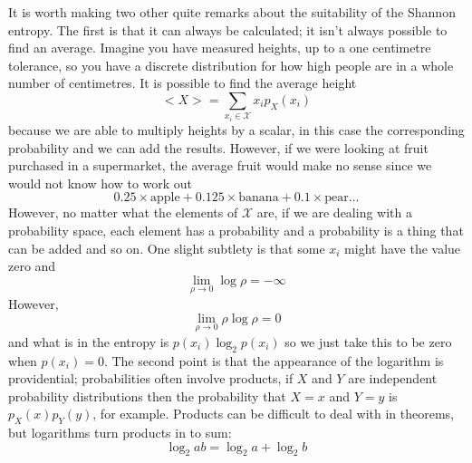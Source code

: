 \documentclass[11pt,a4paper]{scrartcl}
\begin{document}
It is worth making two other quite remarks about the suitability of
the Shannon entropy. The first is that it can always be calculated; it
isn't always possible to find an average. Imagine you have measured
heights, up to a one centimetre tolerance, so you have a discrete
distribution for how high people are in a whole number of centimetres. It is possible to find the average height
\begin{equation}
<X>=\sum_{x_i\in\mathcal{X}}x_ip_X(x_i)
\end{equation}
because we are able to multiply heights by a scalar, in this case the
corresponding probability and we can add the results. However, if we
were looking at fruit purchased in a supermarket, the average fruit
would make no sense since we would not know how to work out
\begin{equation}
0.25\times \mbox{apple}+0.125\times \mbox{banana}+0.1\times \mbox{pear}\ldots
\end{equation}
However, no matter what the elements of $\mathcal{X}$ are, if we are
dealing with a probability space, each element has a probability and a
probability is a thing that can be added and so on. One slight subtlety is that some $x_i$ might have the value zero and 
\begin{equation}
\lim_{\rho \rightarrow 0}\log{\rho}=-\infty
\end{equation}
However, 
\begin{equation}
\lim_{\rho \rightarrow 0}\rho\log{\rho}=0
\end{equation}
and what is in the entropy is $p(x_i)\log_2{p(x_i)}$ so we just take
this to be zero when $p(x_i)=0$. The second point is that the
appearance of the logarithm is providential; probabilities often
involve products, if $X$ and $Y$ are independent probability
distributions then the probability that $X=x$ and $Y=y$ is
$p_X(x)p_Y(y)$, for example. Products can be difficult to deal with in
theorems, but logarithms turn products in to sum:
\begin{equation}
\log_2{ab}=\log_2{a}+\log_2{b}
\end{equation}
\end{document}
